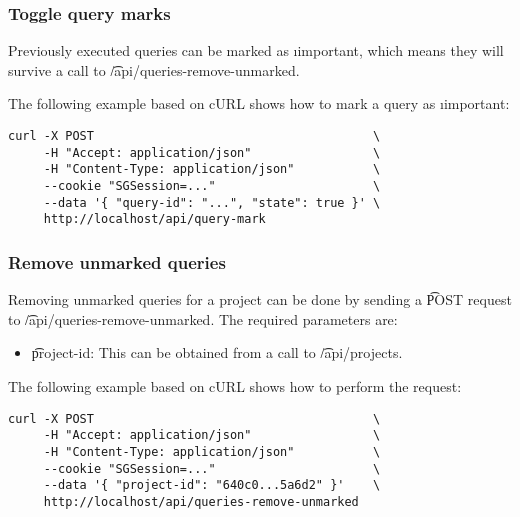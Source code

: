 \subsubsection{Toggle query marks}

\begin{sloppypar}
  Previously executed queries can be marked as \i{important}, which means
  they will survive a call to \t{/api/queries-remove-unmarked}.
\end{sloppypar}

  The following example based on cURL shows how to mark a query as
  \i{important}:

\begin{lstlisting}
curl -X POST                                       \
     -H "Accept: application/json"                 \
     -H "Content-Type: application/json"           \
     --cookie "SGSession=..."                      \
     --data '{ "query-id": "...", "state": true }' \
     http://localhost/api/query-mark
\end{lstlisting}

\subsubsection{Remove unmarked queries}

  Removing unmarked queries for a project can be done by sending a
  \t{POST} request to \t{/api/queries-remove-unmarked}.
  The required parameters are:

  \begin{itemize}
    \item{\t{project-id}: This can be obtained from a call to
      \t{/api/projects}.}
  \end{itemize}

  The following example based on cURL shows how to perform the request:

\begin{lstlisting}
curl -X POST                                       \
     -H "Accept: application/json"                 \
     -H "Content-Type: application/json"           \
     --cookie "SGSession=..."                      \
     --data '{ "project-id": "640c0...5a6d2" }'    \
     http://localhost/api/queries-remove-unmarked
\end{lstlisting}
